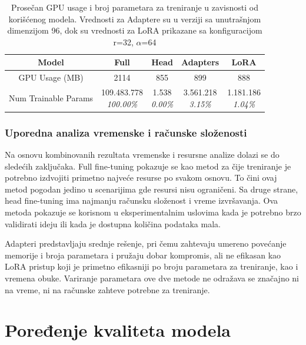 \documentclass[12pt,oneside]{memoir}
\begin{document}
\begin{table}[h!]
	\centering
	\setlength{\tabcolsep}{12pt}
	\renewcommand{\arraystretch}{3}
	\begin{tabular}{|c|c|c|c|c|} 
		\hline
		Model & Full & Head & Adapters & LoRA \\
		\hline
		GPU Usage (MB) & 2114 & 855 & 899 & 888  \\ 
		\hline
		Num Trainable Params & \makecell{109.483.778 \\ \textit{100.00\%}} & \makecell{1.538 \\ \textit{0.00\%}} & \makecell{3.561.218 \\ \textit{3.15\%}} & \makecell{1.181.186 \\ \textit{1.04\%}} \\ 
		\hline
	\end{tabular}
	\caption{Prosečan GPU usage i broj parametara za treniranje u zavisnosti od korišćenog modela. Vrednosti za Adaptere su u verziji sa unutrašnjom dimenzijom 96, dok su vrednosti za LoRA prikazane sa konfiguracijom r=32, \(\alpha\)=64 }
	\label{tab:TrainingStatsUsage}
\end{table}

\subsubsection{Uporedna analiza vremenske i računske složenosti}
Na osnovu kombinovanih rezultata vremenske i resursne analize dolazi se do sledećih zaključaka. Full fine-tuning pokazuje se kao metod za čije treniranje je potrebno izdvojiti primetno najveće resurse po svakom osnovu. To čini ovaj metod pogodan jedino u scenarijima gde resursi nisu ograničeni. Sa druge strane, head fine-tuning ima najmanju računsku složenost i vreme izvršavanja. Ova metoda pokazuje se korisnom u eksperimentalnim uslovima kada je potrebno brzo validirati ideju ili kada je dostupna količina podataka mala. 

Adapteri predstavljaju srednje rešenje, pri čemu zahtevaju umereno povećanje memorije i broja parametara i pružaju dobar kompromis, ali ne efikasan kao LoRA pristup koji je primetno efikasniji po broju parametara za treniranje, kao i vremena obuke. Variranje parametara ove dve metode ne odražava se značajno ni na vreme, ni na računske zahteve potrebne za treniranje.

\section{Poređenje kvaliteta modela}
\end{document}
